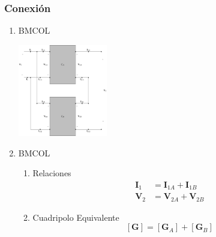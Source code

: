 \subsubsection{Conexión}
\label{sec:org5e14c91}
\begin{enumerate}
\item \hfill{}\textsc{BMCOL}
\label{sec:org43cb61d}
\begin{center}
\includegraphics[height=4cm]{../figs/paralelo-serie.pdf}
\end{center}
\item \hfill{}\textsc{BMCOL}
\label{sec:orge5d2f92}
\begin{enumerate}
\item Relaciones
\label{sec:orge6945d2}
\begin{align*}
  \mathbf{I}_1 &= \mathbf{I}_{1A} + \mathbf{I}_{1B}\\
  \mathbf{V}_2 &= \mathbf{V}_{2A} + \mathbf{V}_{2B}
\end{align*}

\item Cuadripolo Equivalente
\label{sec:orgd5cfc0b}
\[
  \boxed{[\mathbf{G}] = [\mathbf{G}_A] + [\mathbf{G}_B]}
\]
\end{enumerate}
\end{enumerate}


